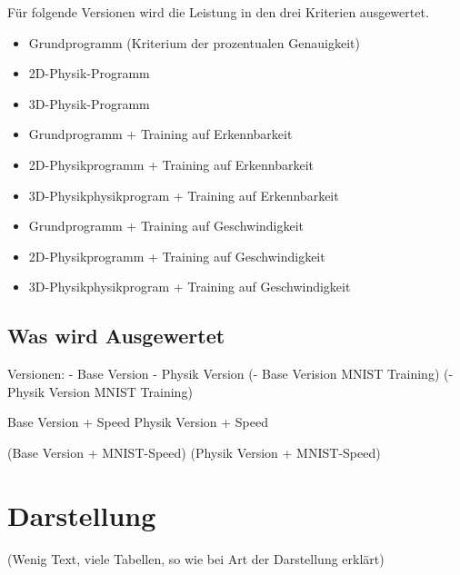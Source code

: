 Für folgende Versionen wird die Leistung in den drei Kriterien ausgewertet.
\begin{itemize}
    \item Grundprogramm (Kriterium der prozentualen Genauigkeit)
    \item 2D-Physik-Programm
    \item 3D-Physik-Programm
    \item Grundprogramm + Training auf Erkennbarkeit
    \item 2D-Physikprogramm + Training auf Erkennbarkeit
    \item 3D-Physikphysikprogram + Training auf Erkennbarkeit
    \item Grundprogramm + Training auf Geschwindigkeit
    \item 2D-Physikprogramm + Training auf Geschwindigkeit
    \item 3D-Physikphysikprogram + Training auf Geschwindigkeit
\end{itemize}








    
\subsection*{Was wird Ausgewertet}
Versionen:
    - Base Version
    - Physik Version
    (- Base Verision MNIST Training)
    (- Physik Version MNIST Training)

    Base Version + Speed 
    Physik Version + Speed 
    
    (Base Version + MNIST-Speed)
    (Physik Version + MNIST-Speed)


\section{Darstellung}
(Wenig Text, viele Tabellen, so wie bei Art der Darstellung erklärt)








